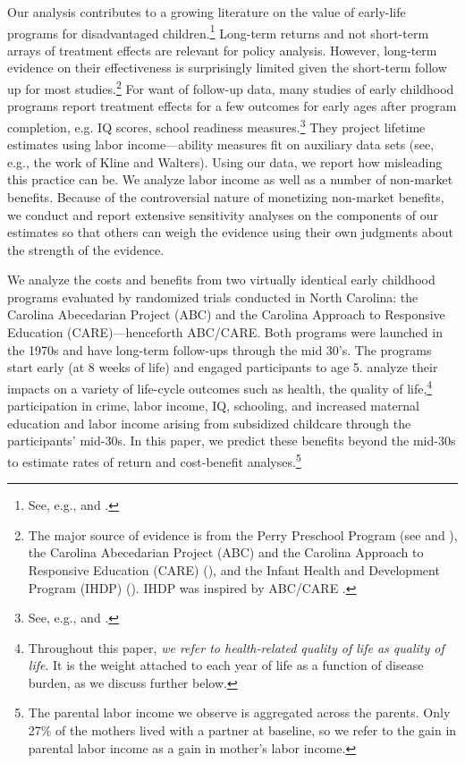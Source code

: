 Our analysis contributes to a growing literature on the value of early-life programs for disadvantaged children.\footnote{See, e.g., \cite{Currie_2011_AER} and \cite{Elango_Hojman_etal_2016_Early-Edu}.} Long-term returns and not short-term arrays of treatment effects are relevant for policy analysis. However, long-term evidence on their effectiveness is surprisingly limited given the short-term follow up for most studies.\footnote{The major source of evidence is from the Perry Preschool Program (see \citealp{Schweinhart_Montie_ea_2005_BOOKlifetime} and \citealp{Heckman_Moon_etal_2010_QE,Heckman_Moon_etal_2010_RateofReturn}), the Carolina Abecedarian Project (ABC) and the Carolina Approach to Responsive Education (CARE) (\citealp{Ramey_Campbell_etal_2000_ADS,Ramey-etal_2012-ABC}), and the Infant Health and Development Program (IHDP) (\citealp{Gross_Spiker_etal_1997_BOOKHelpinglowbirth,Duncan_Sojourner_2013_JHR}). IHDP was inspired by ABC/CARE \citep[][]{Gross_Spiker_etal_1997_BOOKHelpinglowbirth}.} For want of follow-up data, many studies of early childhood programs report treatment effects for a few outcomes for early ages after program completion, e.g. IQ scores, school readiness measures.\footnote{See, e.g., \cite{Kline_Walters_2016_QJE} and \cite{Weiland_2013_CD_Impacts-of-Pre-K}.} They project lifetime estimates using labor income---ability measures fit on auxiliary data sets (see, e.g., the work of Kline and Walters). Using our data, we report how misleading this practice can be. We analyze labor income as well as a number of non-market benefits. Because of the controversial nature of monetizing non-market benefits, we conduct and report extensive sensitivity analyses on the components of our estimates so that others can weigh the evidence using their own judgments about the strength of the evidence.

We analyze the costs and benefits from two virtually identical early childhood programs evaluated by randomized trials conducted in North Carolina: the Carolina Abecedarian Project (ABC) and the Carolina Approach to Responsive Education (CARE)---henceforth ABC/CARE. Both programs were launched in the 1970s and have long-term follow-ups through the mid 30's. The programs start early (at 8 weeks of life) and engaged participants to age 5. \cite{Garcia_Ziff_2017_Gender-Diff_UNPUBLISHED} analyze their impacts on a variety of life-cycle outcomes such as health, the quality of life,\footnote{Throughout this paper, \textit{we refer to health-related quality of life as quality of life}. It is the weight attached to each year of life as a function of disease burden, as we discuss further below.} participation in crime, labor income, IQ, schooling, and increased maternal education and labor income arising from subsidized childcare through the participants' mid-30s. In this paper, we predict these benefits beyond the mid-30s to estimate rates of return and cost-benefit analyses.\footnote{The parental labor income we observe is aggregated across the parents. Only 27\% of the mothers lived with a partner at baseline, so we refer to the gain in parental labor income as a gain in mother's labor income.}

